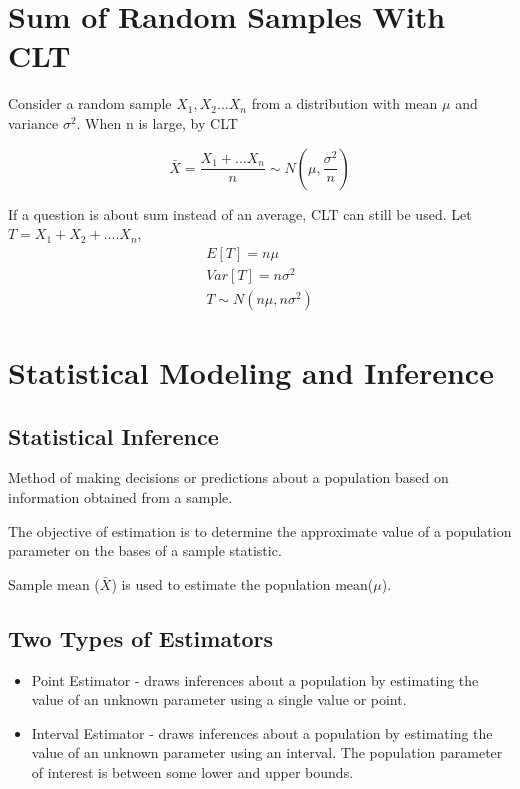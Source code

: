 \documentclass{article}
\begin{document}
    \section*{Sum of Random Samples With CLT}
    Consider a random sample $X_{1}, X_{2}... X_{n}$ from a distribution with mean $\mu$ and variance
    $\sigma^{2}$. When n is large, by CLT

    \begin{equation*}    
          \bar{X} = \frac{X_{1}+...X_{n}}{n} \sim N(\mu, \frac{\sigma^{2}}{n})
    \end{equation*}

    If a question is about sum instead of an average, CLT can still be used.
    Let $T = X_{1} + X_{2} + .... X_{n}$,
    \begin{align*}
        E[T] = n\mu\\
        Var[T] = n\sigma^{2}\\
        T \sim N(n\mu, n\sigma^{2})
    \end{align*}

    \section*{Statistical Modeling and Inference}
    \subsection*{Statistical Inference}
    Method of making decisions or predictions about a population 
    based on information obtained from a sample.\par

    The objective of estimation is to determine the approximate value
    of a population parameter on the bases of a sample statistic.\par

    Sample mean ($\bar{X}$) is used to estimate the population mean($\mu$).\par

    \subsection*{Two Types of Estimators}
        \begin{itemize}  
            \item Point Estimator - draws inferences about a population 
                                    by estimating the value of an unknown parameter using a single value
                                    or point.
            \item Interval Estimator - draws inferences about a population
                                    by estimating the value of an unknown parameter using an interval.
                                    The population parameter of interest is between some lower and upper bounds.
        \end{itemize}
\end{document}
